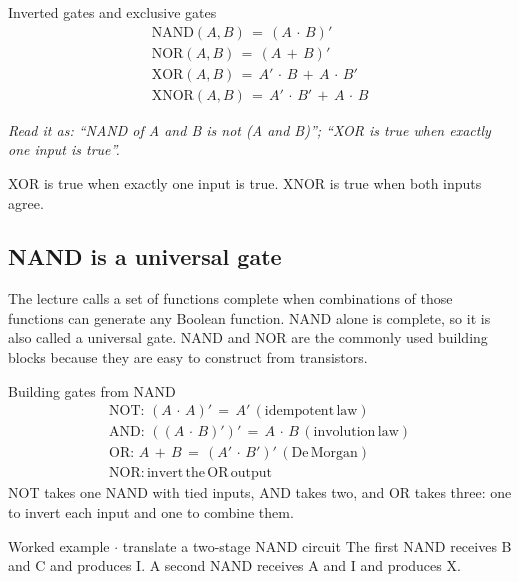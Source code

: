 \documentclass[11pt]{article}
\begin{document}
\begin{keepsection}
\begin{keepsection}
\begin{equationcard}{Inverted gates and exclusive gates}
\[ \begin{gathered} \text{NAND}({A},{B})\, =\, ({A}\, \cdot \, {B})' \\ \text{NOR}({A},{B})\, =\, ({A}\, +\, {B})' \\ \text{XOR}({A},{B})\, =\, {A}'\, \cdot \, {B}\, +\, {A}\, \cdot \, {B}' \\ \text{XNOR}({A},{B})\, =\, {A}'\, \cdot \, {B}'\, +\, {A}\, \cdot \, {B} \end{gathered} \]
{\small \emph{Read it as: “NAND of A and B is not (A and B)”; “XOR is true when exactly one input is true”.}\par XOR is true when exactly one input is true. XNOR is true when both inputs agree.}
\end{equationcard}
\end{keepsection}

\begin{keepsection}
\subsection{NAND is a universal gate}

The lecture calls a set of functions complete when combinations of those functions can generate any Boolean function. NAND alone is complete, so it is also called a universal gate. NAND and NOR are the commonly used building blocks because they are easy to construct from transistors.

\begin{equationcard}{Building gates from NAND}
\[ \begin{gathered} \text{NOT}:\, ({A}\, \cdot \, {A})'\, =\, {A}'\, (\text{idempotent}\, \text{law}) \\ \text{AND}:\, (({A}\, \cdot \, {B})')'\, =\, {A}\, \cdot \, {B}\, (\text{involution}\, \text{law}) \\ \text{OR}:\, {A}\, +\, {B}\, =\, ({A}'\, \cdot \, {B}')'\, (\text{De}\, \text{Morgan}) \\ \text{NOR}:\, \text{invert}\, \text{the}\, \text{OR}\, \text{output} \end{gathered} \]
{\small NOT takes one NAND with tied inputs, AND takes two, and OR takes three: one to invert each input and one to combine them.}
\end{equationcard}

\begin{workedbox}{Worked example \ensuremath{\cdot} translate a two-stage NAND circuit}
The first NAND receives B and C and produces I. A second NAND receives A and I and produces X.


\end{workedbox}
\end{keepsection}
\end{keepsection}
\end{document}
